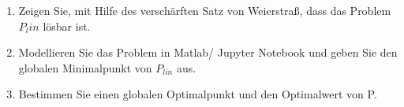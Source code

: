 \documentclass[12pt]{extreport} %
\newcommand{\R}{\mathbb{R}}
\theoremstyle{named}
\theoremstyle{nnamed}
\theoremstyle{itshape}
\theoremstyle{normal}
\begin{document}
\begin{enumerate}
\begin{proof}
			\begin{align*}
				\tilde{f}(x) & = -\min\big\{- x_1 - 3, -\left|x_2 - 4\right|, x_1 + x_2 - 20\big\} \\
				& = ~~ \max\big\{ x_1 + 3, \left|x_2 - 4\right|, -(x_1 + x_2) + 20\big\}.  
			\end{align*} 
			Aus der Epigraph-Formulierung bedeutet die  Bedingung $\tilde{f}(x) \leq \alpha$, dass jede Komponente des Maximums kleiner gleich $\alpha$ sein muss, d.h. das folgende Problem besitzt die selben Optimalpunkte wie $P_{epi}$:
			$$  \tilde{P}_{epi}: \min_{(x, \alpha) \in \R^2 \times R} e^{\alpha} \text{ s.t. } x \in X, \begin{cases} x_1 + 3 \leq \alpha \\
			 x_2 - 4 \leq \alpha, ~ - x_2 + 4 \geq - \alpha \\ -(x_1 + x_2) + 20 \leq \alpha \end{cases} $$
			 Da die Exponentialfunktion streng monoton ist, ist jedes Minimum der Identität auf dieser Menge gleich dem Minimum der Exponentialfunktion. D.h. ein lineares Optimierungsproblem $P_{lin}$, welches die selben Optimalpunkte wie $P_{epi}$ besitzt, lautet
			$$  \tilde{P}_{epi}: \min_{(x, \alpha) \in \R^2 \times R} \alpha \text{ s.t. } x \in X, \begin{cases} x_1 + 3 \leq \alpha \\
			 x_2 - 4 \leq \alpha, ~ - x_2 + 4 \geq - \alpha \\ -(x_1 + x_2) + 20 \leq \alpha \end{cases} $$			 
		\end{proof}
	\item Zeigen Sie, mit Hilfe des verschärften Satz von Weierstraß, dass das Problem $P_lin$ lösbar ist.
	\item Modellieren Sie das Problem in Matlab/ Jupyter Notebook und geben Sie den globalen Minimalpunkt von $P_{lin}$ aus.
	\item Bestimmen Sie einen globalen Optimalpunkt und den Optimalwert von P.
\end{enumerate}
\end{document}
